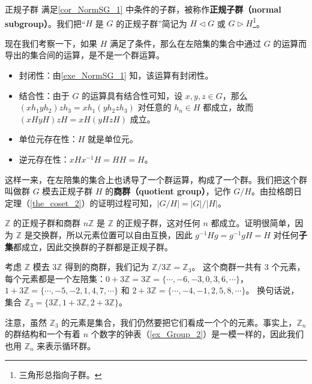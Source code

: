 \begin{definition}{正规子群}\label{def_NormSG_1}
满足\autoref{cor_NormSG_1} 中条件的子群，被称作\textbf{正规子群（normal subgroup）}。我们把“$H$ 是 $G$ 的正规子群”简记为 $H\vartriangleleft G$ 或 $G\vartriangleright H$\footnote{三角形总指向子群。}。
\end{definition}

现在我们考察一下，如果 $H$ 满足了条件，那么在左陪集的集合中通过 $G$ 的运算而导出的集合间的运算，是不是一个群运算。
\begin{itemize}
\item 封闭性：由\autoref{exe_NormSG_1} 知，该运算有封闭性。
\item 结合性：由于 $G$ 的运算具有结合性可知，设 $x, y, z\in G$，那么 $(xh_1yh_2)zh_3=xh_1(yh_2zh_3)$ 对任意的 $h_n\in H$ 都成立，故而 $(xHyH)zH=xH(yHzH)$ 成立。
\item 单位元存在性：$H$ 就是单位元。
\item 逆元存在性：$xHx^{-1}H=HH=H$。
\end{itemize}

这样一来，在左陪集的集合上也诱导了一个群运算，构成了一个群。我们把这个群叫做群 $G$ 模去正规子群 $H$ 的\textbf{商群（quotient group）}，记作 $G/H$。由拉格朗日定理（\autoref{the_coset_2}）的证明过程可知，$|G/H|={|G|}/{|H|}$。

\begin{example}{$\mathbb{Z}$ 的正规子群和商群}\label{ex_NormSG_4}
$n\mathbb{Z}$ 是 $\mathbb{Z}$ 的正规子群，这对任何 $n$ 都成立。证明很简单，因为 $\mathbb{Z}$ 是交换群，所以元素位置可以自由互换，因此 $g^{-1}Hg=g^{-1}gH=H$ 对任何\textbf{子集}都成立，因此交换群的子群都是正规子群。

考虑 $\mathbb{Z}$ 模去 $3\mathbb{Z}$ 得到的商群，我们记为 $\mathbb{Z}/3\mathbb{Z}=\mathbb{Z}_3$。 这个商群一共有 $3$ 个元素，每个元素都是一个左陪集：$0+3\mathbb{Z}=3\mathbb{Z}=\{\cdots, -6, -3, 0, 3, 6, \cdots\}$，$1+3\mathbb{Z}=\{\cdots, -5, -2, 1, 4, 7, \cdots\}$ 和 $2+3\mathbb{Z}=\{\cdots, -4, -1, 2, 5, 8, \cdots\}$。 换句话说，集合 $\mathbb{Z}_3=\{3\mathbb{Z}, 1+3\mathbb{Z}, 2+3\mathbb{Z}\}$。

注意，虽然 $\mathbb{Z}_3$ 的元素是集合，我们仍然要把它们看成一个个的元素。事实上，$\mathbb{Z}_n$ 的群结构和一个有着 $n$ 个数字的钟表（\autoref{ex_Group_2}）是一模一样的，因此我们也用 $\mathbb{Z}_n$ 来表示循环群。 
\end{example}

